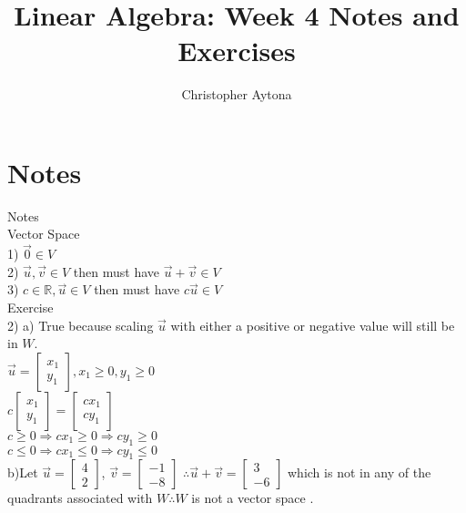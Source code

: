\documentclass[a4paper]{article}
\begin{document}
\title{Linear Algebra: Week 4 Notes and Exercises}
\author{Christopher Aytona}
\maketitle

\section{Notes}
Notes\\

Vector Space\\
1) $\vec{0} \in V$\\
2) $\vec{u}, \vec{v} \in V$ then must have $\vec{u} + \vec{v} \in V$\\
3) $c \in \mathbb{R}, \vec{u} \in V$ then must have $c \vec{u} \in V$\\
Exercise\\

2) a) True because scaling $\vec{u}$ with either a positive or negative value will still be in $W$.\\
$\vec{u} = \begin{bmatrix}
x_1\\
y_1
\end{bmatrix}, x_1 \geq 0, y_1 \geq 0$\\
$c \begin{bmatrix}
x_1\\
y_1
\end{bmatrix} = \begin{bmatrix}
cx_1\\
cy_1
\end{bmatrix}$\\
$c \geq 0 \Rightarrow cx_1 \geq 0 \Rightarrow cy_1 \geq 0$\\
$c \leq 0 \Rightarrow cx_1 \leq 0 \Rightarrow cy_1 \leq 0$\\
b)Let $\vec{u} = \begin{bmatrix}
4\\
2
\end{bmatrix}$, $\vec{v} = \begin{bmatrix}
-1\\
-8
\end{bmatrix}$ $\therefore \vec{u} + \vec{v} = \begin{bmatrix}
3\\
-6
\end{bmatrix}$ which is not in any of the quadrants associated with $W \therefore W$ is not a vector space .\\
\end{document}
